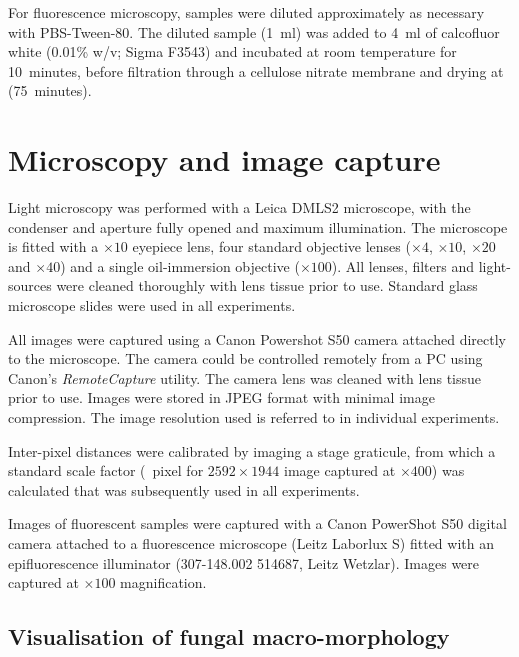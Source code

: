 For fluorescence microscopy, samples were diluted approximately as necessary with PBS-Tween-80. The diluted sample (1~ml) was added to 4~ml of calcofluor white (0.01\% w/v; Sigma F3543) and incubated at room temperature for 10~minutes, before filtration through a cellulose nitrate membrane and drying at  (75~minutes).

\section{Microscopy and image capture}\label{sec:microscopy}

Light microscopy was performed with a Leica DMLS2 microscope, with the condenser and aperture fully opened and maximum illumination. The microscope is fitted with a $\times 10$ eyepiece lens, four standard objective lenses ($\times 4$, $\times 10$, $\times 20$ and $\times 40$) and a single oil-immersion objective ($\times 100$). All lenses, filters and light-sources were cleaned thoroughly with lens tissue prior to use. Standard glass microscope slides were used in all experiments.

All images were captured using a Canon Powershot S50 camera attached directly to the microscope. The camera could be controlled remotely from a PC using Canon's \emph{RemoteCapture} utility. The camera lens was cleaned with lens tissue prior to use. Images were stored in JPEG format with minimal image compression. The image resolution used is referred to in individual experiments.

Inter-pixel distances were calibrated by imaging a stage graticule, from which a standard scale factor (~pixel for $2592 \times 1944$ image captured at $\times 400$) was calculated that was subsequently used in all experiments.

Images of fluorescent samples were captured with a Canon PowerShot S50 digital camera attached to a fluorescence microscope (Leitz Laborlux S) fitted with an epifluorescence illuminator (307-148.002 514687, Leitz Wetzlar). Images were captured at $\times 100$ magnification.

\subsection{Visualisation of fungal macro-morphology}\label{sec:PelletScan}

